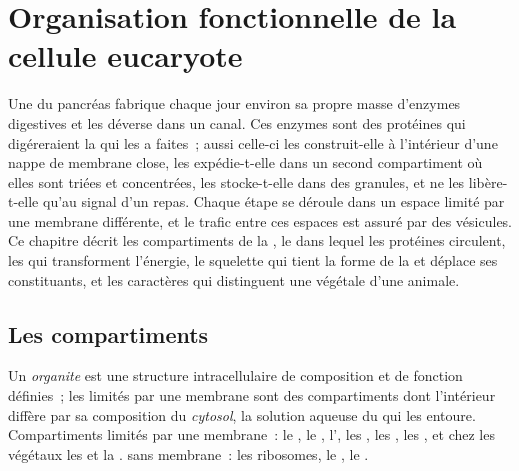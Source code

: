 \chapter{Organisation fonctionnelle de la cellule eucaryote}\label{ch:b1:eukaryotic-cell}

Une  du pancréas fabrique chaque jour environ sa propre masse
d'enzymes digestives et les déverse dans un canal. Ces enzymes sont des
protéines qui digéreraient la  qui les a faites~; aussi
celle-ci les construit-elle à l'intérieur d'une nappe de membrane close,
les expédie-t-elle dans un second compartiment où elles sont triées et
concentrées, les stocke-t-elle dans des granules, et ne les libère-t-elle
qu'au signal d'un repas. Chaque étape se déroule dans un espace limité
par une membrane différente, et le trafic entre ces espaces est assuré
par des vésicules. Ce chapitre décrit les compartiments de la , le  dans lequel les protéines
circulent, les  qui transforment l'énergie, le squelette qui
tient la forme de la  et déplace ses constituants, et les
caractères qui distinguent une  végétale d'une  animale.

\section{Les compartiments}

\begin{definition}\label{def:b1:eukaryotic-cell:organelle}
Un \emph{organite} est une structure intracellulaire de
composition et de fonction définies~; les  limités par une
membrane sont des compartiments dont l'intérieur diffère par sa
composition du \emph{cytosol}, la solution aqueuse du
 qui les entoure. Compartiments limités par une membrane~: le
, le , l', les ,
les , les , et chez les végétaux les  et
la .  sans membrane~: les ribosomes, le , le
.
\end{definition}

